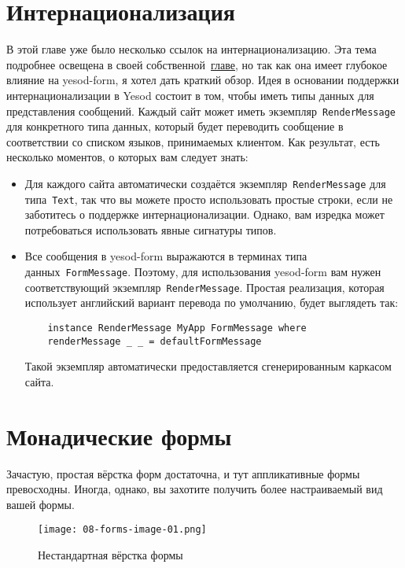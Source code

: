 \section{Интернационализация}
В этой главе уже было несколько ссылок на интернационализацию. Эта тема
подробнее освещена в своей собственной~\hyperref[chap:i18n]{главе}, но так как
она имеет глубокое влияние на yesod-form, я хотел дать краткий обзор.  Идея в
основании поддержки интернационализации в Yesod состоит в том, чтобы иметь
типы данных для представления сообщений. Каждый сайт может иметь
экземпляр~\lstinline'RenderMessage' для конкретного типа данных, который будет
переводить сообщение в соответствии со списком языков, принимаемых клиентом.
Как результат, есть несколько моментов, о которых вам следует знать:
\begin{itemize}
    \item  Для каждого сайта автоматически создаётся
        экземпляр~\lstinline'RenderMessage' для типа~\lstinline'Text', так что
        вы можете просто использовать простые строки, если не заботитесь о
        поддержке интернационализации. Однако, вам изредка может потребоваться
        использовать явные сигнатуры типов.

    \item Все сообщения в yesod-form выражаются в терминах типа
        данных~\lstinline'FormMessage'.  Поэтому, для использования yesod-form
        вам нужен соответствующий экземпляр~\lstinline'RenderMessage'. Простая
        реализация, которая использует английский вариант перевода по
        умолчанию, будет выглядеть так:
\begin{lstlisting}
    instance RenderMessage MyApp FormMessage where
    renderMessage _ _ = defaultFormMessage
\end{lstlisting}
        Такой экземпляр автоматически предоставляется сгенерированным каркасом
        сайта.
\end{itemize}

\section{Монадические формы}
Зачастую, простая вёрстка форм достаточна, и тут аппликативные формы
превосходны. Иногда, однако, вы захотите получить более настраиваемый вид вашей
формы.
\begin{figure}[tbph]
  \centering
  \texttt{[image: 08-forms-image-01.png]}
  \caption{Нестандартная вёрстка формы}
\end{figure}

